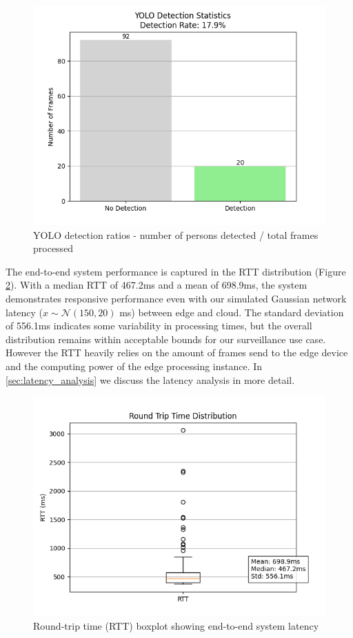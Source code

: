 \documentclass[conference]{IEEEtran}
\begin{document}
\begin{figure}[h!]
    \centering
    \includegraphics[width=1\linewidth]{./res/evaluation_with_latencies/yolo_ratios.png}
    \caption{YOLO detection ratios - number of persons detected / total frames processed}
    \label{fig:yolo_ratios}
\end{figure}


The end-to-end system performance is captured in the RTT distribution (Figure \ref{fig:rtt_distribution}). With a median RTT of 467.2ms and a mean of 698.9ms, the system demonstrates responsive performance even with our simulated Gaussian network latency ($x \sim \mathcal{N}(150, 20)$ ms) between edge and cloud. The standard deviation of 556.1ms indicates some variability in processing times, but the overall distribution remains within acceptable bounds for our surveillance use case. However the RTT heavily relies on the amount of frames send to the edge device and the computing power of the edge processing instance. In \ref {sec:latency_analysis} we discuss the latency analysis in more detail.

\begin{figure}[h!]
    \centering
    \includegraphics[width=1\linewidth]{./res/evaluation_with_latencies/rtt_distribution.png}
    \caption{Round-trip time (RTT) boxplot showing end-to-end system latency}
    \label{fig:rtt_distribution}
\end{figure}
\end{document}
